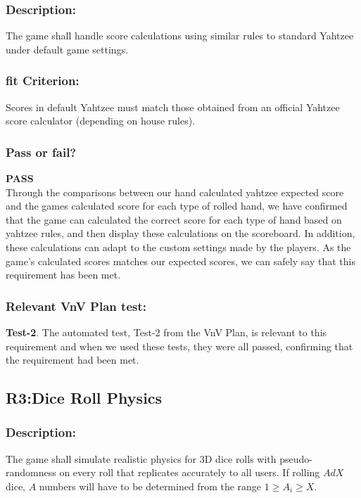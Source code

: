 \documentclass[12pt, titlepage]{article}
\begin{document}
   \subsubsection{Description:}  The game shall handle score calculations using similar rules to standard Yahtzee under default game settings.

 \subsubsection{fit Criterion:}  Scores in default Yahtzee must match those obtained from an official Yahtzee score calculator (depending on house rules).
 
 \subsubsection{Pass or fail?}
 
 \noindent \textbf{PASS}\\
 
 \noindent  Through the comparisons between our hand calculated yahtzee  expected score and the games calculated score for each type of rolled hand, we have confirmed that the game can calculated the correct score for each type of hand based on yahtzee rules, and then display these calculations on the scoreboard. In addition, these calculations can adapt to the custom settings made by the players. As the game's calculated scores matches our expected scores, we can safely say that this requirement has been met. 
 
 \subsubsection{Relevant VnV Plan test: }  \textbf{ Test-2}. The automated test, Test-2 from the VnV Plan, is relevant to this requirement and when we used these tests, they were all passed, confirming that the requirement had been met.

\subsection{ R3:Dice Roll Physics} 
  
\subsubsection{Description:}The game shall simulate realistic physics for 3D dice rolls with pseudo-randomness on every roll that replicates accurately to all users. If rolling $AdX$ dice, $A$ numbers will have to be determined from the range $1 \geq A_{i} \geq X$.
\end{document}
